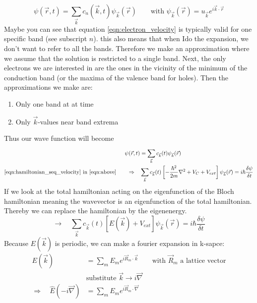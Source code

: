 \begin{myproof}
	\begin{equation}
		\psi(\vec{r}, t) = \sum_{\vec{k}}^{}c_n(\vec{k}, t)\psi_{\vec{k}}(\vec{r}) \qquad \text{with } \psi_{\vec{k}}(\vec{r}) = u_{\vec{k}}e^{i\vec{k}\cdot\vec{r}}
	\end{equation}
	Maybe you can see that equation \ref{eqn:electron_velocity} is typically valid for one specific band (see subscript $n$). this also means that when Ido the expansion, we don't want to refer to all the bands. Therefore we make an approximation where we assume that the solution is restricted to a single band. Next, the only electrons we are interested in are the ones in the vicinity of the minimum of the conduction band (or the maxima of the valence band for holes).
	Then the approximations we make are:
	\begin{enumerate}
		\setlength\itemsep{0pt}
		\item Only one band at at time
		\item Only $\vec{k}$-values near band extrema
	\end{enumerate}
	Thus our wave function will become
	\begin{align}
		\psi(\vec{r}, t) &= \sum_{\vec{k}}^{}c_{\vec{k}}(t)\psi_{\vec{k}}(\vec{r}) \label{eqn:above} \\
		\ref{eqn:hamiltonian_seq_velocity} \text{ in } \ref{eqn:above} \qquad \Rightarrow \quad & \sum_{\vec{k}}^{} c_{\vec{k}}(t)\left[-\frac{\hbar^2}{2m}\nabla^2 + V_C + V_{ext}\right]\psi_{\vec{k}}(\vec{r}) = i\hbar\frac{\delta \psi}{\delta t}
	\end{align}
	If we look at the total hamiltonian acting on the eigenfunction of the Bloch hamiltonian meaning the wavevector is an eigenfunction of the total hamiltonian. Thereby we can replace the hamiltonian by the eigenenergy.
	\begin{equation}
		\rightarrow \quad \sum_{\vec{k}}^{} c_{\vec{k}}(t)\left[E(\vec{k}) + V_{ext}\right]\psi_{\vec{k}}(\vec{r}) = i\hbar\frac{\delta \psi}{\delta t}
	\end{equation}
	Because $E(\vec{k})$ is periodic, we can make a fourier expansion in k-sapce:
	\begin{align}
		E(\vec{k}) &= \sum_m^{}E_me^{i\vec{R}_m\cdot\vec{k}} \qquad \text{with $\vec{R}_m$ a lattice vector}\\
		& \text{substitute } \vec{k} \rightarrow i\vec{\nabla} \nonumber \\
		\Rightarrow \quad \hat{E}(-i\vec{\nabla}) &= \sum_m^{}E_me^{i\vec{R}_m\cdot\vec{\nabla}} \label{eqn:engery_nabla}

\end{align}
\end{myproof}
